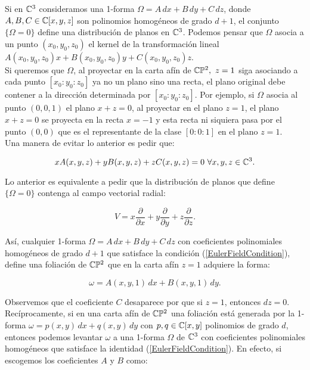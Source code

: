 Si en $\mathbb{C}^{3}$ consideramos una 1-forma $\Omega=A\, dx+B\, dy+C\, dz$, donde $A,B,C\in\mathbb{C}[x,y,z]$ son polinomios homogéneos de grado $d+1$, el conjunto $\{\Omega=0\}$ define una distribución de planos en $\mathbb{C}^{3}$. Podemos pensar que $\Omega$ asocia a un punto $(x_{0},y_{0},z_{0})$ el kernel de la transformación lineal $A(x_{0},y_{0},z_{0})x+B(x_{0},y_{0},z_{0})y+C(x_{0},y_{0},z_{0})z$.\\

Si queremos que $\Omega$, al proyectar en la carta afín de $\mathbb{C}\mathbb{P}^{2},\ z=1$ siga asociando a cada punto $[x_{0}:y_{0}:z_{0}]$ ya no un plano sino una recta, el plano original debe contener a la dirección determinada por $[x_{0}:y_{0}:z_{0}]$. Por ejemplo, si $\Omega$ asocia al punto $(0,0,1)$ el plano $x+z=0$, al proyectar en el plano $z=1$, el plano $x+z=0$ se proyecta en la recta $x=-1$ y esta recta ni siquiera pasa por el punto $(0,0)$ que es el representante de la clase $[0:0:1]$ en el plano $z=1$.\\

Una manera de evitar lo anterior es pedir que:

\begin{equation}
\label{EulerFieldCondition}
xA(x,y,z)+yB(x,y,z)+zC(x,y,z)=0 \,\, \forall x,y,z\in\mathbb{C}^{3}.
\end{equation}

\noindent Lo anterior es equivalente a pedir que la distribución de planos que define $\{\Omega=0\}$ contenga al campo vectorial radial:

\begin{equation}
\label{RadialVectorField}
V=x\frac{\partial}{\partial x}+y\frac{\partial}{\partial y}+z\frac{\partial}{\partial z}.
\end{equation}

\noindent Así, cualquier 1-forma $\Omega=A\, dx+B\, dy+C\, dz$ con coeficientes polinomiales homogéneos de grado $d+1$ que satisface la condición (\ref{EulerFieldCondition}), define una foliación de $\mathbb{C}\mathbb{P}^{2}$ que en la carta afín $z=1$ adquiere la forma:

\begin{equation}
\label{FormaAfin}
\omega=A(x,y,1)\, dx+B(x,y,1)\, dy.
\end{equation}

\noindent Observemos que el coeficiente $C$ desaparece por que si $z=1$, entonces $dz=0$.\\

Recíprocamente, si en una carta afín de $\mathbb{C}\mathbb{P}^{2}$ una foliación está generada por la 1-forma $\omega=p(x,y)\, dx+q(x,y)\, dy$ con $p,q\in\mathbb{C}[x,y]$ polinomios de grado $d$, entonces podemos levantar $\omega$ a una 1-forma $\Omega$ de $\mathbb{C}^{3}$ con coeficientes polinomiales homogéneos que satisface la identidad (\ref{EulerFieldCondition}). En efecto, si escogemos los coeficientes $A$ y $B$ como:

